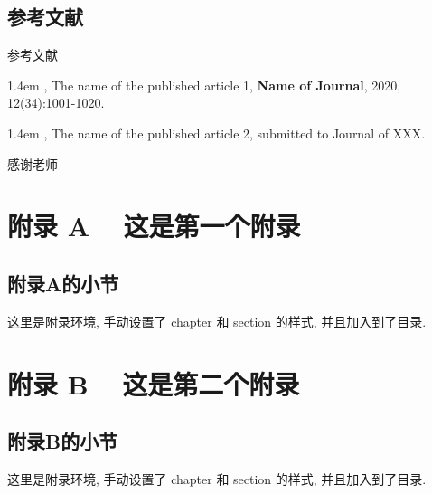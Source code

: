 \documentclass{base}
\begin{document}
\section{参考文献}

参考文献

\backmatter



\begin{researchpage}
\hangindent 1.4em
,  The name of the published article 1, {\bf  Name of Journal}, 2020, 12(34):1001-1020.

\hangindent 1.4em
, The name of the published article 2, submitted to
Journal of XXX.


\end{researchpage}

\begin{thankpage}
\setlength{\baselineskip}{24pt}

感谢老师

\end{thankpage}



\appendix

\renewcommand{\chaptermark}[1]{\markboth{#1}{}}

\chapter{附录 A ~ 这是第一个附录}
\renewcommand{\thesection}{A.\arabic{section}}
\section{附录A的小节}

这里是附录环境, 手动设置了 chapter 和 section 的样式, 并且加入到了目录.

\chapter{附录 B ~ 这是第二个附录}
\renewcommand{\thesection}{B.\arabic{section}}
\section{附录B的小节}

这里是附录环境, 手动设置了 chapter 和 section 的样式, 并且加入到了目录.
\end{document}
